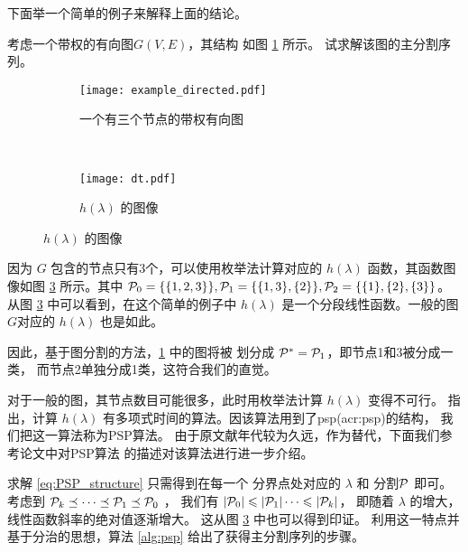 下面举一个简单的例子来解释上面的结论。
\begin{example}\label{ex:psp}
考虑一个带权的有向图$G(V,E)$，其结构
如图 \ref{fig:example_directed} 所示。
试求解该图的主分割序列。
\end{example}
\begin{figure}
  \centering
  \begin{subfigure}[b]{0.4\linewidth}
  \texttt{[image: example\_directed.pdf]}
  \caption{一个有三个节点的带权有向图}
  \label{fig:example_directed}
  \end{subfigure}~
  \begin{subfigure}[b]{0.5\linewidth}
    \texttt{[image: dt.pdf]}
    \caption{$h(\lambda)$ 的图像}
    \label{fig:dt}
    \end{subfigure}  
\end{figure}

因为
$G$ 包含的节点只有3个，可以使用枚举法计算对应的 $h(\lambda)$
函数，其函数图像如图 \ref{fig:dt} 所示。其中
$\P_0=\{ \{1,2,3\} \}, \P_1 = \{\{1,3\}, \{2\} \},
\P_2 =\{\{1\},\{2\},\{3\} \}$。
从图 \ref{fig:dt} 中可以看到，在这个简单的例子中
$h(\lambda)$
是一个分段线性函数。一般的图$G$对应的
$h(\lambda)$ 也是如此。

因此，基于图分割的方法，\ref{fig:example_directed}
中的图将被 划分成 $\P^*=\P_1$，即节点1和3被分成一类，
而节点2单独分成1类，这符合我们的直觉。

对于一般的图，其节点数目可能很多，此时用枚举法计算
$h(\lambda)$ 变得不可行。\citet{narayanan} 指出，计算
$h(\lambda)$ 有多项式时间的算法。因该算法用到了\gls{psp}(\gls{acr:psp})的结构，
我们把这一算法称为PSP算法。
由于原文献年代较为久远，作为替代，下面我们参考\citet{mac}论文中对PSP算法
的描述对该算法进行进一步介绍。

求解 \eqref{eq:PSP_structure} 只需得到在每一个
分界点处对应的 $\lambda$ 和 分割$\P$ 即可。
考虑到 $\P_k \preceq \dots \preceq \P_1 \preceq \P_0$
，
我们有 $|\P_0| \leq |\P_1| \dots \leq |\P_k|$，
即随着 $\lambda $ 的增大，线性函数斜率的绝对值逐渐增大。
这从图 \ref{fig:dt} 中也可以得到印证。
利用这一特点并基于分治的思想，算法 \ref{alg:psp} 
给出了获得主分割序列的步骤。

\renewcommand{\algorithmicrequire}{\textbf{输入：}\unskip}
\renewcommand{\algorithmicensure}{\textbf{输出：}\unskip}

